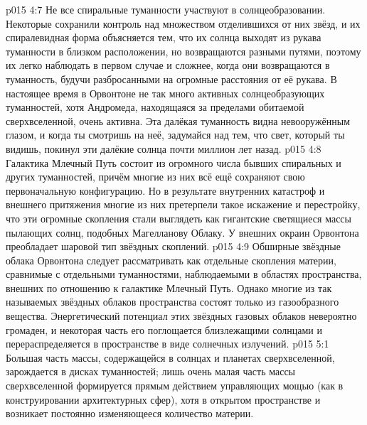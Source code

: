 \vs p015 4:7 Не все спиральные туманности участвуют в солнцеобразовании. Некоторые сохранили контроль над множеством отделившихся от них звёзд, и их спиралевидная форма объясняется тем, что их солнца выходят из рукава туманности в близком расположении, но возвращаются разными путями, поэтому их легко наблюдать в первом случае и сложнее, когда они возвращаются в туманность, будучи разбросанными на огромные расстояния от её рукава. В настоящее время в Орвонтоне не так много активных солнцеобразующих туманностей, хотя Андромеда, находящаяся за пределами обитаемой сверхвселенной, очень активна. Эта далёкая туманность видна невооружённым глазом, и когда ты смотришь на неё, задумайся над тем, что свет, который ты видишь, покинул эти далёкие солнца почти миллион лет назад.
\vs p015 4:8 Галактика Млечный Путь состоит из огромного числа бывших спиральных и других туманностей, причём многие из них всё ещё сохраняют свою первоначальную конфигурацию. Но в результате внутренних катастроф и внешнего притяжения многие из них претерпели такое искажение и перестройку, что эти огромные скопления стали выглядеть как гигантские светящиеся массы пылающих солнц, подобных Магелланову Облаку. У внешних окраин Орвонтона преобладает шаровой тип звёздных скоплений.
\vs p015 4:9 Обширные звёздные облака Орвонтона следует рассматривать как отдельные скопления материи, сравнимые с отдельными туманностями, наблюдаемыми в областях пространства, внешних по отношению к галактике Млечный Путь. Однако многие из так называемых звёздных облаков пространства состоят только из газообразного вещества. Энергетический потенциал этих звёздных газовых облаков невероятно громаден, и некоторая часть его поглощается близлежащими солнцами и перераспределяется в пространстве в виде солнечных излучений.
\vs p015 5:1 Большая часть массы, содержащейся в солнцах и планетах сверхвселенной, зарождается в дисках туманностей; лишь очень малая часть массы сверхвселенной формируется прямым действием управляющих мощью (как в конструировании архитектурных сфер), хотя в открытом пространстве и возникает постоянно изменяющееся количество материи.
